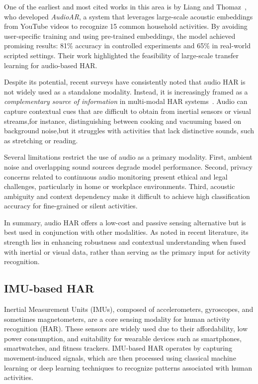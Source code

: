 One of the earliest and most cited works in this area is by Liang and Thomaz~\cite{liang2018audioar}, who developed \textit{AudioAR}, a system that leverages large-scale acoustic embeddings from YouTube videos to recognize 15 common household activities. By avoiding user-specific training and using pre-trained embeddings, the model achieved promising results: 81\% accuracy in controlled experiments and 65\% in real-world scripted settings. Their work highlighted the feasibility of large-scale transfer learning for audio-based HAR.

Despite its potential, recent surveys have consistently noted that audio HAR is not widely used as a standalone modality. Instead, it is increasingly framed as a \textit{complementary source of information} in multi-modal HAR systems~\cite{shin2025comprehensive, kaseris2024comprehensive}. Audio can capture contextual cues that are difficult to obtain from inertial sensors or visual streams,for instance, distinguishing between cooking and vacuuming based on background noise,but it struggles with activities that lack distinctive sounds, such as stretching or reading.

Several limitations restrict the use of audio as a primary modality. First, ambient noise and overlapping sound sources degrade model performance. Second, privacy concerns related to continuous audio monitoring present ethical and legal challenges, particularly in home or workplace environments. Third, acoustic ambiguity and context dependency make it difficult to achieve high classification accuracy for fine-grained or silent activities.

In summary, audio HAR offers a low-cost and passive sensing alternative but is best used in conjunction with other modalities. As noted in recent literature, its strength lies in enhancing robustness and contextual understanding when fused with inertial or visual data, rather than serving as the primary input for activity recognition.

\subsection{IMU-based HAR}

Inertial Measurement Units (IMUs), composed of accelerometers, gyroscopes, and sometimes magnetometers, are a core sensing modality for human activity recognition (HAR). These sensors are widely used due to their affordability, low power consumption, and suitability for wearable devices such as smartphones, smartwatches, and fitness trackers. IMU-based HAR operates by capturing movement-induced signals, which are then processed using classical machine learning or deep learning techniques to recognize patterns associated with human activities.

